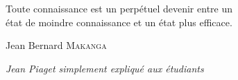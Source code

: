 \begin{flushright}
Toute connaissance est un perpétuel devenir entre un\\
état de moindre connaissance et un état plus efficace.

Jean Bernard \textsc{Makanga}

\emph{Jean Piaget simplement expliqué aux étudiants}
\end{flushright}